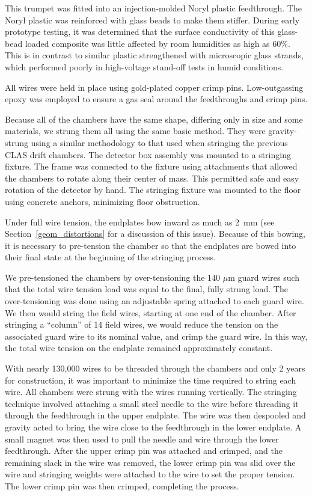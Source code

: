 This trumpet was fitted into an injection-molded Noryl plastic feedthrough.  
The Noryl plastic was reinforced with glass beads to make them stiffer.
During early prototype testing, it was determined that the surface conductivity
of this glass-bead loaded composite was little affected by room humidities
as high as 60\%.  This is in contrast to similar plastic strengthened
with microscopic glass strands, which performed poorly in high-voltage stand-off
tests in humid conditions.

All wires were held in place using gold-plated copper crimp pins.  
Low-outgassing epoxy was employed to ensure a gas seal around the feedthroughs 
and crimp pins.  

Because all of the chambers have the same shape, differing only in
size and some materials, we strung them all using the same basic method.
They were gravity-strung using a similar methodology to that 
used when stringing the previous CLAS drift chambers.  The detector box 
assembly was mounted to a stringing fixture.  The frame was connected to 
the fixture using attachments that allowed the chambers to rotate along 
their center of mass.  This permitted safe and easy 
rotation of the detector by hand.  
The stringing fixture was mounted to the floor using 
concrete anchors, minimizing floor obstruction.

Under full wire tension, the endplates bow inward as much as 2~mm 
(see Section~\ref{geom_distortions} for a discussion of this issue).
Because of this bowing, it is necessary to pre-tension the chamber
so that the endplates are bowed into their final state at the 
beginning of the stringing process.

We pre-tensioned the chambers by over-tensioning the 140 $\mu$m guard
wires such that the total wire tension load was equal to the final, 
fully strung load.  The over-tensioning was done using an adjustable
spring attached to each guard wire. 
We then would string the field wires, starting at one end of the chamber.
After stringing a ``column'' of 14 field wires, we would reduce the
tension on the associated guard wire to its nominal value, and crimp
the guard wire.  In this way, the total wire tension on the endplate
remained approximately constant.

With nearly 130,000 wires to be threaded through the chambers and only 2 years 
for construction, it was important to minimize the time required to string 
each wire.  All chambers were strung with 
the wires running vertically.  The stringing technique involved attaching a 
small steel needle to the wire before threading it through the feedthrough in 
the upper endplate.  The wire was then despooled and gravity acted to bring the 
wire close to the feedthrough in the lower endplate.  A small magnet was then 
used to pull the needle and wire through the lower feedthrough.  After the upper 
crimp pin was attached and crimped, and the remaining slack in the wire was removed, the lower 
crimp pin was slid over the wire and stringing weights were attached to the wire to set the 
proper tension.  The lower crimp pin was then crimped, completing the process.

